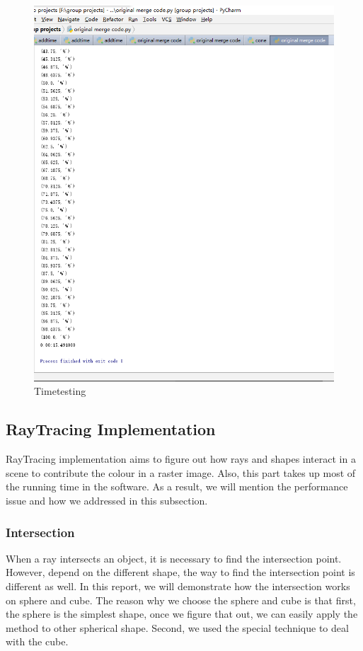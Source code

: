 \documentclass[a4paper, 12pt]{article}
\begin{document}
\begin{figure}[H]
\centering
\includegraphics[scale=0.4]{ShD_Timetesting_part4.png}
  \caption{Timetesting}
     \label{fig:Timetestingpart4}
\end{figure}

\subsection{RayTracing Implementation}
RayTracing implementation aims to figure out how rays and shapes interact in a scene to contribute the colour in a raster image. Also, this part takes up most of the running time in the software. As a result, we will mention the performance issue and how we addressed in this subsection.

\subsubsection{Intersection}
When a ray intersects an object, it is necessary to find the intersection point. However, depend on the different shape, the way to find the intersection point is different as well. In this report, we will demonstrate how the intersection works on sphere and cube. The reason why we choose the sphere and cube is that first, the sphere is the simplest shape, once we figure that out, we can easily apply the method to other spherical shape. Second, we used the special technique to deal with the cube.
\end{document}
